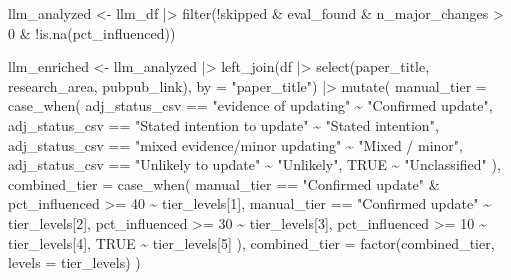 \documentclass[
  11pt,
  letterpaper,
]{article}
\newenvironment{Shaded}{\begin{snugshade}}{\end{snugshade}}
\newcommand{\AttributeTok}[1]{\textcolor[rgb]{0.40,0.45,0.13}{#1}}
\newcommand{\ConstantTok}[1]{\textcolor[rgb]{0.56,0.35,0.01}{#1}}
\newcommand{\DecValTok}[1]{\textcolor[rgb]{0.68,0.00,0.00}{#1}}
\newcommand{\FunctionTok}[1]{\textcolor[rgb]{0.28,0.35,0.67}{#1}}
\newcommand{\NormalTok}[1]{\textcolor[rgb]{0.00,0.23,0.31}{#1}}
\newcommand{\OtherTok}[1]{\textcolor[rgb]{0.00,0.23,0.31}{#1}}
\newcommand{\SpecialCharTok}[1]{\textcolor[rgb]{0.37,0.37,0.37}{#1}}
\newcommand{\StringTok}[1]{\textcolor[rgb]{0.13,0.47,0.30}{#1}}
\begin{document}
\begin{Shaded}
\begin{Highlighting}[]
\NormalTok{  llm\_analyzed }\OtherTok{\textless{}{-}}\NormalTok{ llm\_df }\SpecialCharTok{|\textgreater{}}
    \FunctionTok{filter}\NormalTok{(}\SpecialCharTok{!}\NormalTok{skipped }\SpecialCharTok{\&}\NormalTok{ eval\_found }\SpecialCharTok{\&}\NormalTok{ n\_major\_changes }\SpecialCharTok{\textgreater{}} \DecValTok{0} \SpecialCharTok{\&} \SpecialCharTok{!}\FunctionTok{is.na}\NormalTok{(pct\_influenced))}

\NormalTok{  llm\_enriched }\OtherTok{\textless{}{-}}\NormalTok{ llm\_analyzed }\SpecialCharTok{|\textgreater{}}
    \FunctionTok{left\_join}\NormalTok{(df }\SpecialCharTok{|\textgreater{}} \FunctionTok{select}\NormalTok{(paper\_title, research\_area, pubpub\_link), }\AttributeTok{by =} \StringTok{"paper\_title"}\NormalTok{) }\SpecialCharTok{|\textgreater{}}
    \FunctionTok{mutate}\NormalTok{(}
      \AttributeTok{manual\_tier =} \FunctionTok{case\_when}\NormalTok{(}
\NormalTok{        adj\_status\_csv }\SpecialCharTok{==} \StringTok{"evidence of updating"}          \SpecialCharTok{\textasciitilde{}} \StringTok{"Confirmed update"}\NormalTok{,}
\NormalTok{        adj\_status\_csv }\SpecialCharTok{==} \StringTok{"Stated intention to update"}    \SpecialCharTok{\textasciitilde{}} \StringTok{"Stated intention"}\NormalTok{,}
\NormalTok{        adj\_status\_csv }\SpecialCharTok{==} \StringTok{"mixed evidence/minor updating"} \SpecialCharTok{\textasciitilde{}} \StringTok{"Mixed / minor"}\NormalTok{,}
\NormalTok{        adj\_status\_csv }\SpecialCharTok{==} \StringTok{"Unlikely to update"}            \SpecialCharTok{\textasciitilde{}} \StringTok{"Unlikely"}\NormalTok{,}
        \ConstantTok{TRUE}                                              \SpecialCharTok{\textasciitilde{}} \StringTok{"Unclassified"}
\NormalTok{      ),}
      \AttributeTok{combined\_tier =} \FunctionTok{case\_when}\NormalTok{(}
\NormalTok{        manual\_tier }\SpecialCharTok{==} \StringTok{"Confirmed update"} \SpecialCharTok{\&}\NormalTok{ pct\_influenced }\SpecialCharTok{\textgreater{}=} \DecValTok{40} \SpecialCharTok{\textasciitilde{}}\NormalTok{ tier\_levels[}\DecValTok{1}\NormalTok{],}
\NormalTok{        manual\_tier }\SpecialCharTok{==} \StringTok{"Confirmed update"}                        \SpecialCharTok{\textasciitilde{}}\NormalTok{ tier\_levels[}\DecValTok{2}\NormalTok{],}
\NormalTok{        pct\_influenced }\SpecialCharTok{\textgreater{}=} \DecValTok{30}                                     \SpecialCharTok{\textasciitilde{}}\NormalTok{ tier\_levels[}\DecValTok{3}\NormalTok{],}
\NormalTok{        pct\_influenced }\SpecialCharTok{\textgreater{}=} \DecValTok{10}                                     \SpecialCharTok{\textasciitilde{}}\NormalTok{ tier\_levels[}\DecValTok{4}\NormalTok{],}
        \ConstantTok{TRUE}                                                     \SpecialCharTok{\textasciitilde{}}\NormalTok{ tier\_levels[}\DecValTok{5}\NormalTok{]}
\NormalTok{      ),}
      \AttributeTok{combined\_tier =} \FunctionTok{factor}\NormalTok{(combined\_tier, }\AttributeTok{levels =}\NormalTok{ tier\_levels)}
\NormalTok{    )}


\end{Highlighting}
\end{Shaded}
\end{document}
